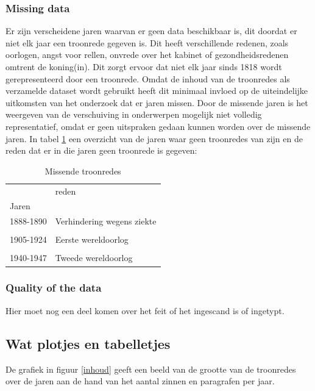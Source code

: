 \subsubsection{Missing data}
Er zijn verscheidene jaren waarvan er geen data beschikbaar is, dit doordat er niet elk jaar een troonrede gegeven is. Dit heeft verschillende redenen, zoals oorlogen, angst voor rellen, onvrede over het kabinet of gezondheidsredenen omtrent de koning(in). Dit zorgt ervoor dat niet elk jaar sinds 1818 wordt gerepresenteerd door een troonrede. Omdat de inhoud van de troonredes als verzamelde dataset wordt gebruikt heeft dit minimaal invloed op de uiteindelijke uitkomsten van het onderzoek dat er jaren missen. Door de missende jaren is het weergeven van de verschuiving in onderwerpen mogelijk niet volledig representatief, omdat er geen uitspraken gedaan kunnen worden over de missende jaren.
In tabel \ref{missing} een overzicht van de jaren waar geen troonredes van zijn en de reden dat er in die jaren geen troonrede is gegeven:
\newline
\newline
\begin{table}[htb]
\centering
\begin{tabular}{ll}
\toprule
{} &                       reden \\
Jaren     &                             \\
\midrule
1888-1890 &  Verhindering wegens ziekte \\
\\
1905-1924 &         Eerste wereldoorlog \\
\\
1940-1947 &         Tweede wereldoorlog \\
\bottomrule
\end{tabular}
\caption{Missende troonredes}
\label{missing}
\end{table}

\subsubsection{Quality of the data}
Hier moet nog een deel komen over het feit of het ingescand is of ingetypt.

\subsection{Wat plotjes en tabelletjes}

De grafiek in figuur \ref{inhoud} geeft een beeld van de grootte van de troonredes over de jaren aan de hand van het aantal zinnen en paragrafen per jaar.

